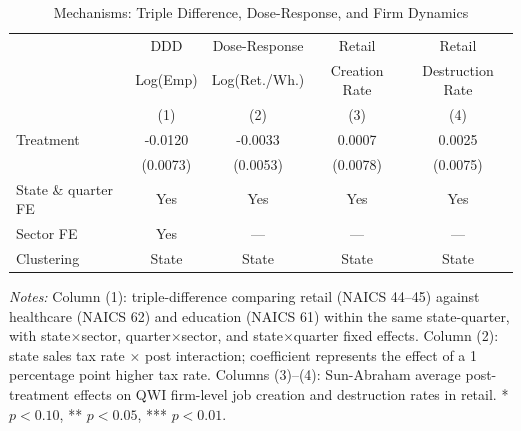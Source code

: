 \begin{table}[t]
\centering
\caption{Mechanisms: Triple Difference, Dose-Response, and Firm Dynamics}
\label{tab:mechanism}
\begin{tabular}{lcccc}
\hline\hline
& DDD & Dose-Response & Retail & Retail \\
& Log(Emp) & Log(Ret./Wh.) & Creation Rate & Destruction Rate \\
& (1) & (2) & (3) & (4) \\
\hline
Treatment & -0.0120 & -0.0033 & 0.0007 & 0.0025 \\
& (0.0073) & (0.0053) & (0.0078) & (0.0075) \\
\hline
State \& quarter FE & Yes & Yes & Yes & Yes \\
Sector FE & Yes & --- & --- & --- \\
Clustering & State & State & State & State \\
\hline\hline
\end{tabular}
\begin{tablenotes}
\small
\item \textit{Notes:} Column (1): triple-difference comparing retail (NAICS 44--45) against healthcare (NAICS 62) and education (NAICS 61) within the same state-quarter, with state$\times$sector, quarter$\times$sector, and state$\times$quarter fixed effects. Column (2): state sales tax rate $\times$ post interaction; coefficient represents the effect of a 1 percentage point higher tax rate. Columns (3)--(4): Sun-Abraham average post-treatment effects on QWI firm-level job creation and destruction rates in retail. * $p<0.10$, ** $p<0.05$, *** $p<0.01$.
\end{tablenotes}
\end{table}
